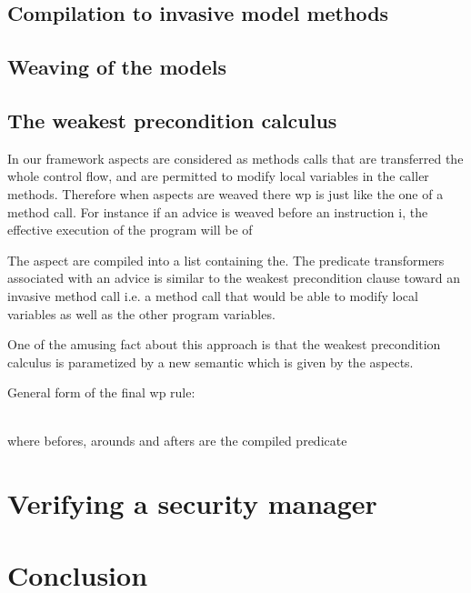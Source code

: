 \documentclass[draft]{llncs}
\begin{document}
\subsection{Compilation to invasive model methods}

\subsection{Weaving of the models}


\subsection{The weakest precondition calculus}

In our framework aspects are considered as methods calls that are
transferred the whole control flow, and are permitted to modify local
variables in the caller methods. Therefore when aspects are weaved
there wp is just like the one of a method call.  For instance if an
advice is weaved before an instruction i, the effective execution of
the program will be of

The aspect are compiled into a list containing the.  The predicate
transformers associated with an advice is similar to the weakest
precondition clause toward an invasive method call i.e. a method call
that would be able to modify local variables as well as the other
program variables.

One of the amusing fact about this approach is that the weakest
precondition calculus is parametized by a new semantic which is given
by the aspects.

General form of the final wp rule:
\bcode

\\
\ecode
where befores, arounds and afters are the compiled predicate

%
\section{Verifying a security manager}

\section{Conclusion}

%
%




%
\end{document}
